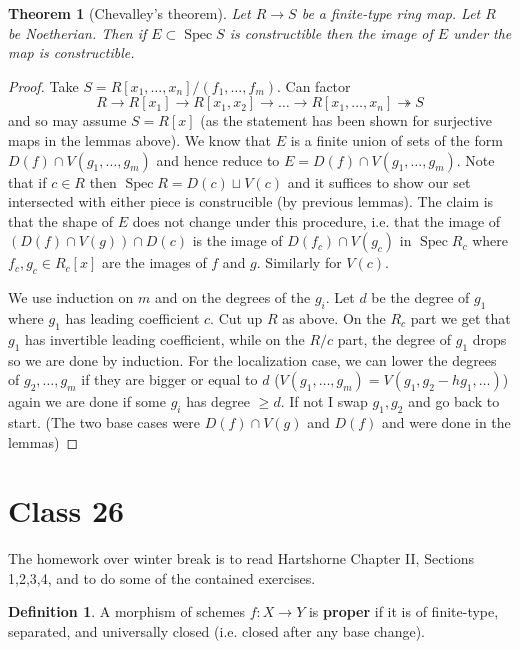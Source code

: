 \documentclass{article}
\DeclareMathOperator{\Spec}{Spec}
\theoremstyle{plain}
\newtheorem{thm}{Theorem}
\theoremstyle{definition}
\newtheorem{defn}{Definition}
\theoremstyle{remark}
\begin{document}
\begin{thm}[Chevalley's theorem]
Let $R\to S$ be a finite-type ring map. Let $R$ be Noetherian. Then if $E\subset\Spec S$ is constructible then the image of $E$ under the map is constructible.
\end{thm}

\begin{proof}
Take $S=R[x_1,\ldots,x_n]/(f_1,\ldots, f_m)$. Can factor
\[R\to R[x_1]\to R[x_1,x_2]\to\ldots\to R[x_1,\ldots,x_n]\twoheadrightarrow S\]
and so may assume $S=R[x]$ (as the statement has been shown for surjective maps in the lemmas above). We know that $E$ is a finite union of sets of the form $D(f)\cap V(g_1,\ldots,g_m)$ and hence reduce to $E=D(f)\cap V(g_1,\ldots,g_m)$. Note that if $c\in R$ then $\Spec R=D(c)\sqcup V(c)$ and it suffices to show our set intersected with either piece is construcible (by previous lemmas). The claim is that the shape of $E$ does not change under this procedure, i.e. that the image of $(D(f)\cap V(g))\cap D(c)$ is the image of $D(f_c)\cap V(g_c)$ in $\Spec R_c$ where $f_c,g_c\in R_c[x]$ are the images of $f$ and $g$. Similarly for $V(c)$.

We use induction on $m$ and on the degrees of the $g_i$. Let $d$ be the degree of $g_1$ where $g_1$ has leading coefficient $c$. Cut up $R$ as above. On the $R_c$ part we get that $g_1$ has invertible leading coefficient, while on the $R/c$ part, the degree of $g_1$ drops so we are done by induction. For the localization case, we can lower the degrees of $g_2,\ldots, g_m$ if they are bigger or equal to $d$ ($V(g_1,\ldots, g_m)=V(g_1,g_2-hg_1,\ldots)$) again we are done if some $g_i$ has degree $\geq d$. If not I swap $g_1,g_2$ and go back to start. (The two base cases were $D(f)\cap V(g)$ and $D(f)$ and were done in the lemmas)
\end{proof}

\section*{Class 26}

The homework over winter break is to read Hartshorne Chapter II, Sections 1,2,3,4, and to do some of the contained exercises.

\begin{defn}
A morphism of schemes $f:X\to Y$ is \textbf{proper} if it is of finite-type, separated, and universally closed (i.e. closed after any base change).
\end{defn}
\end{document}
